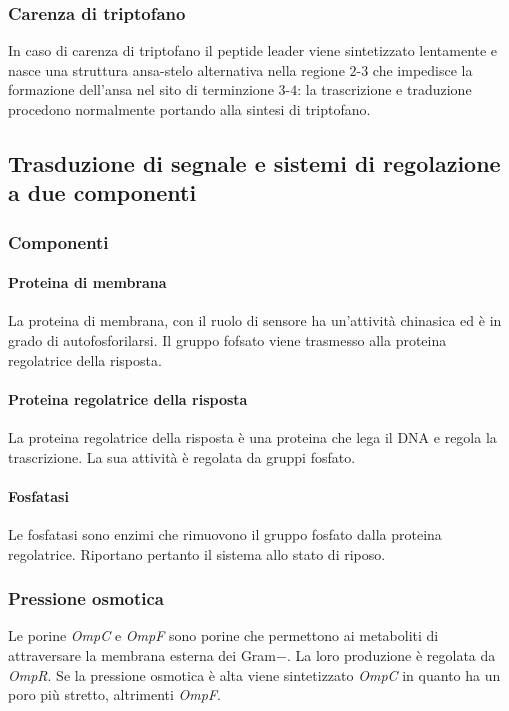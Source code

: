 		\subsubsection{Carenza di triptofano}
		In caso di carenza di triptofano il peptide leader viene sintetizzato lentamente e nasce una struttura ansa-stelo alternativa nella regione $2$-$3$ che impedisce la formazione dell'ansa nel sito di terminzione $3$-$4$: la trascrizione e traduzione procedono normalmente portando alla sintesi di triptofano.


	\subsection{Trasduzione di segnale e sistemi di regolazione a due componenti}

		\subsubsection{Componenti}

			\paragraph{Proteina di membrana}
			La proteina di membrana, con il ruolo di sensore ha un'attivit\`a chinasica ed \`e in grado di autofosforilarsi.
			Il gruppo fofsato viene trasmesso alla proteina regolatrice della risposta.

			\paragraph{Proteina regolatrice della risposta}
			La proteina regolatrice della risposta \`e una proteina che lega il DNA e regola la trascrizione.
			La sua attivit\`a \`e regolata da gruppi fosfato.

			\paragraph{Fosfatasi}
			Le fosfatasi sono enzimi che rimuovono il gruppo fosfato dalla proteina regolatrice.
			Riportano pertanto il sistema allo stato di riposo.
			
		\subsubsection{Pressione osmotica}
		Le porine \emph{OmpC} e \emph{OmpF} sono porine che permettono ai metaboliti di attraversare la membrana esterna dei Gram$-$.
		La loro produzione \`e regolata da \emph{OmpR}.
		Se la pressione osmotica \`e alta viene sintetizzato \emph{OmpC} in quanto ha un poro pi\`u stretto, altrimenti \emph{OmpF}.

